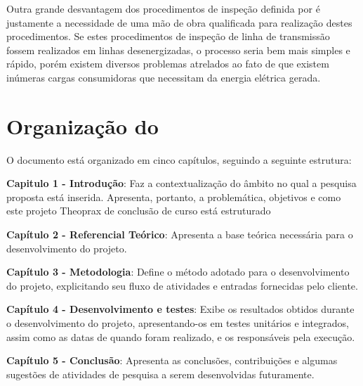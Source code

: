  Outra grande desvantagem dos procedimentos de inspeção definida por \cite{cinematicajuliana} é justamente a necessidade de uma mão de obra qualificada para realização destes procedimentos. Se estes procedimentos de inspeção de linha de transmissão fossem realizados em linhas desenergizadas, o processo seria bem mais simples e rápido, porém existem diversos problemas atrelados ao fato de que existem inúmeras cargas consumidoras que necessitam da energia elétrica gerada.


\section{Organização do \thetypework}
\label{section:organizacao}
O documento está organizado em cinco capítulos, seguindo a seguinte estrutura:

\textbf{Capitulo 1 - Introdução}: Faz a contextualização do âmbito no qual a pesquisa proposta
está inserida. Apresenta, portanto, a problemática, objetivos e como este projeto Theoprax de conclusão de curso está estruturado


\textbf{Capítulo 2 - Referencial Teórico}: Apresenta a base teórica necessária para o desenvolvimento do projeto.

\textbf{Capítulo 3 - Metodologia}: Define o método adotado para o desenvolvimento do projeto, explicitando seu fluxo de atividades e entradas fornecidas pelo cliente.

\textbf{Capítulo 4 - Desenvolvimento e testes}: Exibe os resultados obtidos durante o desenvolvimento do
projeto, apresentando-os em testes unitários e integrados, assim como as datas de quando foram realizado, e os responsáveis pela execução.

\textbf{Capítulo 5 - Conclusão}: Apresenta as conclusões, contribuições e algumas sugestões de atividades de pesquisa a serem desenvolvidas futuramente.

